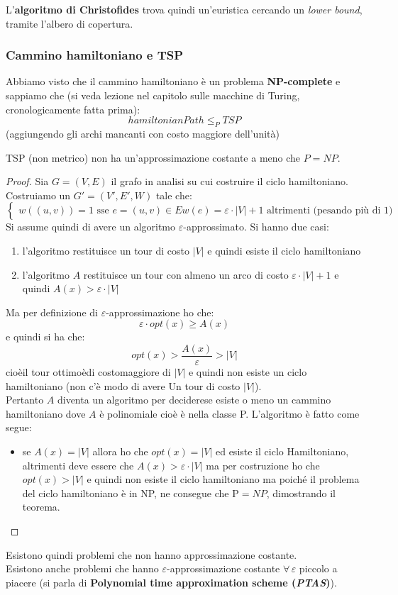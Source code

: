 \documentclass[a4paper,12pt, oneside]{book}
\begin{document}
L'\textbf{algoritmo di Christofides} trova quindi un'euristica cercando un
\textit{lower bound}, tramite l'albero di copertura.\\
\subsubsection{Cammino hamiltoniano e TSP}
Abbiamo visto che il cammino hamiltoniano è un problema \textbf{NP-complete} e
sappiamo che (si veda lezione nel capitolo sulle macchine di Turing,
cronologicamente fatta prima):
\[hamiltonianPath\leq_P TSP\]
(aggiungendo gli archi mancanti con costo maggiore dell'unità)
\begin{teorema}
  TSP (non metrico) non ha un'approssimazione costante a meno che $P=NP$.
\end{teorema}
\begin{proof}
  Sia $G=(V,E)$ il grafo in analisi su cui costruire il ciclo hamiltoniano.
  Costruiamo un
  $G'=(V', E', W)$ tale che:
  \[
    \begin{cases}
      w((u,v)) = 1\mbox{ sse } e=(u,v) \in E
      w(e)=\varepsilon\cdot|V|+1 \mbox{ altrimenti (pesando più di 1)}
    \end{cases}
  \]
  Si assume quindi  di avere un algoritmo $\varepsilon$-approssimato.
  Si hanno due casi:
  \begin{enumerate}
    \item l'algoritmo restituisce un tour di costo $|V|$ e quindi esiste il
    ciclo hamiltoniano
    \item l'algoritmo $A$ restituisce un tour con almeno un arco di costo
    $\varepsilon\cdot|V|+1$ e quindi $A(x)>\varepsilon\cdot |V|$
  \end{enumerate}
  Ma per definizione di $\varepsilon$-approssimazione ho che:
  \[\varepsilon\cdot opt(x)\geq A(x)\]
  e quindi si ha che:
  \[opt(x)>\frac{A(x)}{\varepsilon}>|V|\]
  cioèil tour ottimoèdi costomaggiore di $|V|$ e quindi non esiste un ciclo
  hamiltoniano (non c’è modo di avere Un tour di costo $|V|$).\\
  Pertanto $A$ diventa un algoritmo per deciderese esiste o meno un
  cammino hamiltoniano dove $A$ è polinomiale cioè è nella classe
  P. L’algoritmo è fatto come segue:
  \begin{itemize}
    \item se $A(x)=|V|$ allora ho che $opt(x)=|V|$ ed esiste il ciclo
    Hamiltoniano, altrimenti deve essere che $A(x)>\varepsilon\cdot |V|$ ma per
    costruzione ho che $opt(x)>|V|$ e quindi non esiste il ciclo hamiltoniano ma
    poiché il problema del ciclo hamiltoniano è in NP, ne consegue che P$=NP$,
    dimostrando il teorema.
  \end{itemize}
\end{proof}
Esistono quindi problemi che non hanno approssimazione costante.\\
Esistono anche problemi che hanno $\varepsilon$-approssimazione costante
$\forall\,\varepsilon$ piccolo a piacere (si parla di \textbf{Polynomial time
  approximation scheme (\textit{PTAS})}). 
\end{document}
